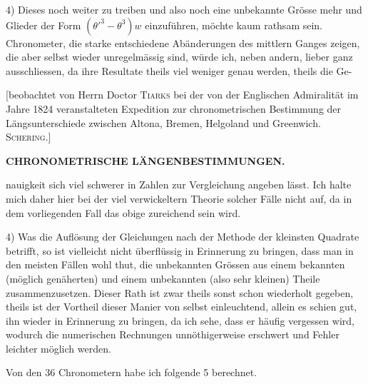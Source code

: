 4) Dieses noch weiter zu treiben und also noch eine unbekannte Grösse mehr und
Glieder der Form $(\theta'^3-\theta^3)w$ einzuführen, möchte kaum rathsam sein. Chronometer, die
starke entschiedene Abänderungen des mittlern Ganges zeigen, die aber selbst wieder
unregelmässig sind, würde ich, neben andern, lieber ganz ausschliessen, da ihre
Resultate theils viel weniger genau werden, theils die Ge-\par
\clearpage
\endgroup
\expandafter\def\csname HistoricalNoteText462\endcsname{[beobachtet von Herrn Doctor \textsc{Tiarks} bei der von der Englischen Admiralität im Jahre 1824
veranstalteten Expedition zur chronometrischen Bestimmung der Längsunterschiede zwischen Altona,
Bremen, Helgoland und Greenwich. \textsc{Schering}.]}
\begingroup
\pagestyle{empty}
\newcommand{\GaussVIGathering}[2]{%
  \fancypagestyle{gaussVIGathering}{%
    \fancyhf{}%
    \renewcommand{\headrulewidth}{0pt}%
    \renewcommand{\footrulewidth}{0pt}%
    \fancyfoot[C]{\makebox[\textwidth][l]{%
      \hspace*{.025\textwidth}{\footnotesize\bfseries #1}\hfill
      {\normalsize\bfseries\textls[90]{#2}}\hspace*{.18\textwidth}}}%
  }%
  \thispagestyle{gaussVIGathering}%
}
\thispagestyle{empty}
\noindent{}%
\makebox[12mm][l]{}%
\parbox[t]{\dimexpr\linewidth-24mm\relax}{\centering\footnotesize\bfseries CHRONOMETRISCHE LÄNGENBESTIMMUNGEN.\par}%
\par\nobreak\medskip
\noindent nauigkeit sich viel schwerer in Zahlen zur Vergleichung angeben lässt. Ich halte mich daher hier bei
der viel verwickeltern Theorie solcher Fälle nicht auf, da in dem vorliegenden Fall das obige zureichend
sein wird.

4) Was die Auflösung der Gleichungen nach der Methode der kleinsten Quadrate betrifft, so ist
vielleicht nicht überflüssig in Erinnerung zu bringen, dass man in den meisten Fällen wohl thut, die
unbekannten Grössen aus einem bekannten (möglich genäherten) und einem unbekannten (also sehr
kleinen) Theile zusammenzusetzen. Dieser Rath ist zwar theils sonst schon wiederholt gegeben, theils
ist der Vortheil dieser Manier von selbst einleuchtend, allein es schien gut, ihn wieder in Erinnerung
zu bringen, da ich sehe, dass er häufig vergessen wird, wodurch die numerischen Rechnungen unnöthigerweise erschwert und Fehler leichter möglich werden.

Von den 36 Chronometern habe ich folgende 5 berechnet.

